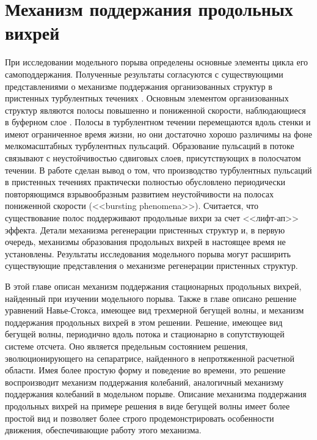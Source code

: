 \chapter{Механизм поддержания продольных вихрей} \label{OXgen_ch}

При исследовании модельного порыва определены основные элементы цикла его самоподдержания. Полученные результаты согласуются с существующими представлениями о механизме поддержания организованных структур в пристенных турбулентных течениях \cite{Hamilton1995, Waleffe1995, Waleffe1997, Jimenez1999, Schoppa2002}. Основным элементом организованных структур являются полосы повышенно и пониженной скорости, наблюдающиеся в буферном слое \cite{Kline1967, Smith1983}. Полосы в турбулентном течении перемещаются вдоль стенки и имеют ограниченное время жизни, но они достаточно хорошо различимы на фоне мелкомасштабных турбулентных пульсаций. Образование пульсаций в потоке связывают с неустойчивостью сдвиговых слоев, присутствующих в полосчатом течении. В работе \cite{Kim1971} сделан вывод о том, что производство турбулентных пульсаций в пристенных течениях практически полностью обусловлено периодически повторяющимся взрывообразным развитием неустойчивости на полосах пониженной скорости (<<bursting phenomena>>). Считается, что существование полос поддерживают продольные вихри за счет <<лифт-ап>> эффекта. Детали механизма регенерации пристенных структур и, в первую очередь, механизмы образования продольных вихрей в настоящее время не установлены. Результаты исследования модельного порыва могут расширить существующие представления о механизме регенерации пристенных структур. 

В этой главе описан механизм поддержания стационарных продольных вихрей, найденный при изучении модельного порыва. Также в главе описано решение уравнений Навье-Стокса, имеющее вид трехмерной бегущей волны, и механизм поддержания продольных вихрей в этом решении. Решение, имеющее вид бегущей волны, периодично вдоль потока и стационарно в сопутствующей системе отсчета. Оно является предельным состоянием решения, эволюционирующего на сепаратрисе, найденного в непротяженной расчетной области. Имея более простую форму и поведение во времени, это решение воспроизводит механизм поддержания колебаний, аналогичный механизму поддержания колебаний в модельном порыве. Описание механизма поддержания продольных вихрей на примере решения в виде бегущей волны имеет более простой вид и позволяет более строго продемонстрировать особенности движения, обеспечивающие работу этого механизма. 


